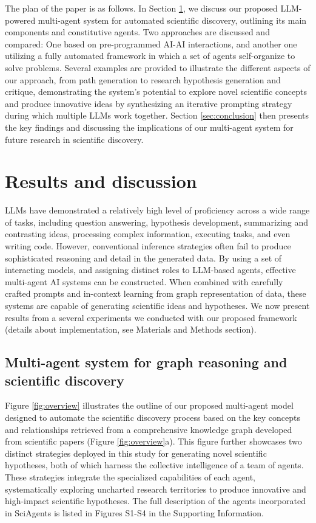 \documentclass{article}
\begin{document}
The plan of the paper is as follows. In Section \ref{sec: results/discussion}, we discuss our proposed LLM-powered multi-agent system for automated scientific discovery, outlining its main components and constitutive agents. Two approaches are discussed and compared: One based on pre-programmed AI-AI interactions, and another one utilizing a fully automated framework in which a set of agents self-organize to solve problems. Several examples are provided to illustrate the different aspects of our approach, from path generation to research hypothesis generation and critique, demonstrating the system's potential to explore novel scientific concepts and produce innovative ideas by synthesizing an iterative prompting strategy during which multiple LLMs work together. Section \ref{sec:conclusion} then presents the key findings and discussing the implications of our multi-agent system for future research in scientific discovery.

\section{Results and discussion}\label{sec: results/discussion}
LLMs have demonstrated a relatively high level of proficiency across a wide range of tasks, including question answering, hypothesis development, summarizing and contrasting ideas, processing complex information, executing tasks, and even writing code. However, conventional inference strategies often fail to produce sophisticated reasoning and detail in the generated data. By using a set of interacting models, and assigning distinct roles to LLM-based agents, effective multi-agent AI systems can be constructed. When combined with carefully crafted prompts and in-context learning from graph representation of data, these systems are capable of  generating scientific ideas and hypotheses. We now present results from a several experiments we conducted with our proposed framework (details about implementation, see Materials and Methods section). 

\subsection{Multi-agent system for graph reasoning and scientific discovery}
Figure \ref{fig:overview} illustrates the outline of our proposed multi-agent model designed to automate the scientific discovery process based on the key concepts and relationships retrieved from a comprehensive knowledge graph developed from scientific papers (Figure \ref{fig:overview}a). This figure further showcases two distinct strategies deployed in this study for generating novel scientific hypotheses, both of which harness the collective intelligence of a team of agents. These strategies integrate the specialized capabilities of each agent, systematically exploring uncharted research territories to produce innovative and high-impact scientific hypotheses. The full description of the agents incorporated in SciAgents is listed in Figures S1-S4 in the Supporting Information.
\end{document}

